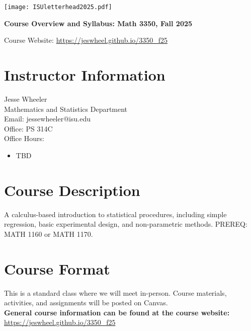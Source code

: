 \documentclass[11pt]{article}\usepackage[]{graphicx}\usepackage[]{xcolor}
\begin{document}



\rule{0cm}{0.3cm}

\vspace{-8mm}

\texttt{[image: ISUletterhead2025.pdf]}


\begin{center}
{\bf \LARGE Course Overview and Syllabus: Math 3350, Fall 2025}
\end{center}

\vspace{3mm}

Course Website: \href{https://jeswheel.github.io/3350\_f25}{https://jeswheel.github.io/3350\_f25}

\section{Instructor Information}

Jesse Wheeler \\
Mathematics and Statistics Department \\
Email: jessewheeler@isu.edu\\
Office: PS 314C\\
Office Hours: 
\begin{itemize}
  \item TBD
\end{itemize}

\section{Course Description}

A calculus-based introduction to statistical procedures, including simple regression, basic experimental design, and non-parametric methods. 
PREREQ: MATH 1160 or MATH 1170.

\section{Course Format}

This is a standard class where we will meet in-person.
Course materials, activities, and assignments will be posted on Canvas.\\ 
\textbf{General course information can be found at the course website:} \href{https://jeswheel.github.io/3350\_f25}{https://jeswheel.github.io/3350\_f25}
\end{document}
